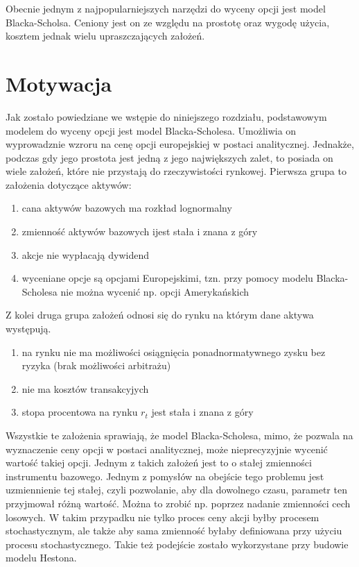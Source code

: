 \documentclass{pracamgr}
\begin{document}
Obecnie jednym z najpopularniejszych narzędzi do wyceny opcji jest model Blacka-Scholsa. Ceniony jest on ze względu na prostotę oraz wygodę użycia, kosztem jednak wielu upraszczających założeń. 


\section{Motywacja} 
Jak zostało powiedziane we wstępie do niniejszego rozdziału, podstawowym modelem do wyceny opcji jest model Blacka-Scholesa.
Umożliwia on wyprowadznie wzroru na cenę opcji europejskiej w postaci analitycznej. Jednakże, podczas gdy jego prostota jest jedną z jego największych zalet, to posiada on wiele założeń, które nie przystają do rzeczywistości rynkowej. Pierwsza grupa to założenia dotyczące aktywów:
\begin{enumerate}
\item cana aktywów bazowych ma rozkład lognormalny
\item zmienność aktywów bazowych ijest stała i znana z góry
\item akcje nie wypłacają dywidend
\item wyceniane opcje są opcjami Europejskimi, tzn. przy pomocy modelu Blacka-Scholesa nie można wycenić np. opcji Amerykańskich
\end{enumerate}
Z kolei druga grupa założeń odnosi się do rynku na którym dane aktywa występują.
\begin{enumerate}
\item na rynku nie ma możliwości osiągnięcia ponadnormatywnego zysku bez ryzyka (brak możliwości arbitrażu)
\item nie ma kosztów transakcyjych
\item stopa procentowa na rynku $r_t$ jest stała i znana z góry 
\end{enumerate}

Wszystkie te założenia sprawiają, że model Blacka-Scholesa, mimo, że pozwala na wyznaczenie ceny opcji w postaci analitycznej, może nieprecyzyjnie wycenić wartość takiej opcji.
Jednym z takich założeń jest to o stałej zmienności instrumentu bazowego. Jednym z pomysłów na obejście tego problemu jest uzmiennienie tej stałej, czyli pozwolanie, aby dla dowolnego czasu, parametr ten przyjmował różną wartość. Można to zrobić np. poprzez nadanie zmienności cech losowych. W takim przypadku nie tylko proces ceny akcji byłby procesem stochastycznym, ale także aby sama zmienność byłaby definiowana przy użyciu procesu stochastycznego. Takie też podejście zostało wykorzystane przy budowie modelu Hestona. \cite{greenwade93}
\end{document}
